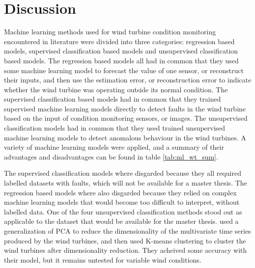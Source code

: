 \newpage
\chapter{Discussion} 

Machine learning methods used for wind turbine condition monitoring encountered in literature were divided into three categories: regression based models, supervised classification based models and unsupervised classification based models. 
The regression based models all had in common that they used some machine learning model to forecast the value of one sensor, or reconstruct their inputs, and then use the estimation error, or reconstruction error to indicate whether the wind turbine was operating outside its normal condition.
The supervised classification based models had in common that they trained supervised machine learning models directly to detect faults in the wind turbine based on the input of condition monitoring sensors, or images. 
The unsupervised classification models had in common that they used trained unsupervised machine learning models to detect anomalous behaviour in the wind turbines. 
A variety of machine learning models were applied, and a summary of their advantages and disadvantages can be found in table \ref{tab:ml_wt_sum}. \bigskip

The supervised classification models where disgarded because they all required labelled datasets with faults, which will not be available for a master thesis. 
The regression based models where also disgarded because they relied on complex machine learning models that would become too difficult to interpret, without labelled data. 
One of the four unsupervised classification methods stood out as applicable to the dataset that would be available for the master thesis. \textcite{fault_detect_PARAFAC_k_means} used a generalization of PCA to reduce the dimensionality of the multivariate time series produced by the wind turbines, and then used K-means clustering to cluster the wind turbines after dimensionality reduction. They acheived some accuracy with their model, but it remains untested for variable wind conditions. 


